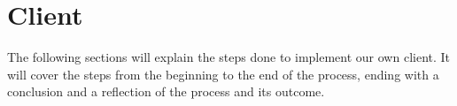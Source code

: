 \section{Client}
The following sections will explain the steps done to implement our own client. It will cover the steps from the beginning to the end of the process, ending with a conclusion and a reflection of the process and its outcome.




